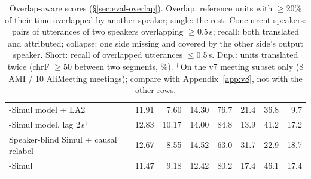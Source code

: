 \begin{table}[t]
\begin{tabular}{lrrrrrrr}
\sys{}-Simul model + LA2 & 11.91 & 7.60 & 14.30 & 76.7 & 21.4 & 36.8 & 9.7 \\
\sys{}-Simul model, lag 2\,s$^\dagger$ & 12.83 & 10.17 & 14.00 & 84.8 & 13.9 & 41.2 & 17.2 \\
Speaker-blind Simul + causal relabel & 12.67 & 8.55 & 14.52 & 63.0 & 31.7 & 22.9 & 18.7 \\
\sys{}-Simul & 11.47 & 9.18 & 12.42 & 80.2 & 17.4 & 46.1 & 17.4 \\
\bottomrule
\end{tabular}
\caption{Overlap-aware scores (\S\ref{sec:eval-overlap}). Overlap: reference units with $\ge$20\% of their time overlapped
by another speaker; single: the rest. Concurrent speakers: pairs of utterances of two speakers overlapping $\ge$0.5\,s;
recall: both translated and attributed; collapse: one side missing and covered by the other side's output speaker. Short:
recall of overlapped utterances $\le$0.5\,s. Dup.: units translated twice (chrF $\ge$50 between two segments, \%).
$^\dagger$\,On the v7 meeting subset only (8 AMI / 10 AliMeeting meetings); compare with Appendix~\ref{app:v8}, not with the
other rows.}
\label{tab:overlap8}
\end{table}
